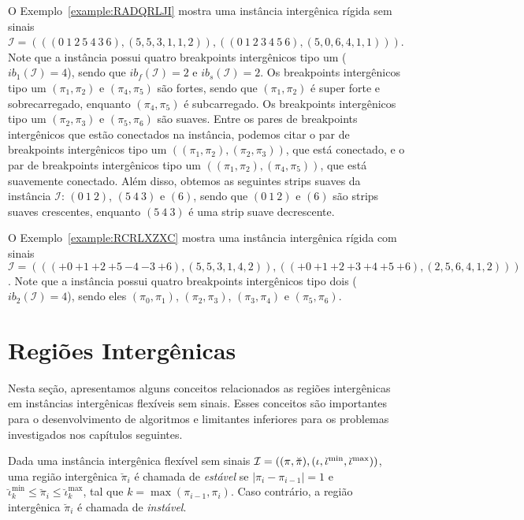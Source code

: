 O Exemplo~\ref{example:RADQRLJI} mostra uma instância intergênica rígida sem sinais $\mathcal{I} = (((0~1~2~5~4~3\allowbreak~6),\allowbreak(5,5,3,1,1,2)),\allowbreak((0~1~2~3~4~5~6),\allowbreak(5,0,6,4,1,1)))$. Note que a instância possui quatro breakpoints intergênicos tipo um ($ib_{1}(\mathcal{I}) = 4$), sendo que $ib_f(\mathcal{I}) = 2$ e $ib_s(\mathcal{I}) = 2$. Os breakpoints intergênicos tipo um $(\pi_1,\pi_2)$ e $(\pi_4,\pi_5)$ são fortes, sendo que $(\pi_1,\pi_2)$ é super forte e sobrecarregado, enquanto $(\pi_4,\pi_5)$ é subcarregado. Os breakpoints intergênicos tipo um $(\pi_2,\pi_3)$ e $(\pi_5,\pi_6)$ são suaves. Entre os pares de breakpoints intergênicos que estão conectados na instância, podemos citar o par de breakpoints intergênicos tipo um $((\pi_1,\pi_2),(\pi_2,\pi_3))$, que está conectado, e o par de breakpoints intergênicos tipo um $((\pi_1,\pi_2),(\pi_4,\pi_5))$, que está suavemente conectado. Além disso, obtemos as seguintes strips suaves da instância $\mathcal{I}$: $(0~1~2)$, $(5~4~3)$ e $(6)$, sendo que $(0~1~2)$ e $(6)$ são strips suaves crescentes, enquanto $(5~4~3)$ é uma strip suave decrescente.



O Exemplo~\ref{example:RCRLXZXC} mostra uma instância intergênica rígida com sinais $\mathcal{I} = \allowbreak((({+0}~{+1}~{+2}~\allowbreak{+5}~{-4}~{-3}~{+6}),\allowbreak(5,5,3,1,4,2)),\allowbreak(({+0}~{+1}~{+2}~{+3}~{+4}~{+5}~{+6}),\allowbreak(2,5,6,4,1,2)))$. Note que a instância possui quatro breakpoints intergênicos tipo dois ($ib_{2}(\mathcal{I}) = 4$), sendo eles $(\pi_0,\pi_1)$, $(\pi_2,\pi_3)$, $(\pi_3,\pi_4)$ e $(\pi_5,\pi_6)$.



\section{Regiões Intergênicas}

Nesta seção, apresentamos alguns conceitos relacionados as regiões intergênicas em instâncias intergênicas flexíveis sem sinais. Esses conceitos são importantes para o desenvolvimento de algoritmos e limitantes inferiores para os problemas investigados nos capítulos seguintes.

\begin{definition}
  Dada uma instância intergênica flexível sem sinais $\mathcal{I} = ((\pi,\breve\pi),\break(\iota,\breve\iota^{\min},\breve\iota^{\max}))$, uma região intergênica $\breve\pi_i$ é chamada de \emph{estável} se $|\pi_{i} - \pi_{i - 1}| = 1$ e $\breve\iota^{\min}_k \le \breve\pi_i \le \breve\iota^{\max}_k$, tal que $k = \max(\pi_{i-1}, \pi_i)$. Caso contrário, a região intergênica $\breve\pi_i$ é chamada de \emph{instável}. 
\end{definition}

